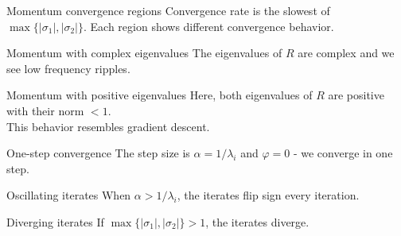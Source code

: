 \documentclass[11pt,compress,t,notes=noshow, xcolor=table]{beamer}
\begin{document}
\begin{framev}[fs=footnotesize]{Momentum convergence regions}
\vfill
Convergence rate is the slowest of $\max \{|\sigma_1|, |\sigma_2| \}$.
Each region shows different convergence behavior.
\end{framev}


\begin{framev}[fs=footnotesize]{Momentum with complex eigenvalues}
{}
\vfill
The eigenvalues of $R$ are complex and we see low frequency ripples.
\end{framev}


\begin{framev}[fs=footnotesize]{Momentum with positive eigenvalues}
{}
\vfill
Here, both eigenvalues of $R$ are positive with their norm $<1$.\\
This behavior resembles gradient descent.
\end{framev}


\begin{framev}[fs=footnotesize]{One-step convergence}
{}
\vfill
The step size is $\alpha = 1/\lambda_i$ and $\varphi = 0$ - we converge in one step.
\end{framev}


\begin{framev}[fs=footnotesize]{Oscillating iterates}
{}
\vfill
When $\alpha > 1/\lambda_i$, the iterates flip sign every iteration.
\end{framev}


\begin{framev}[fs=footnotesize]{Diverging iterates}
{}
\vfill
If $\max \{|\sigma_1|, |\sigma_2| \} > 1$, the iterates diverge.
\end{framev}
\end{document}
